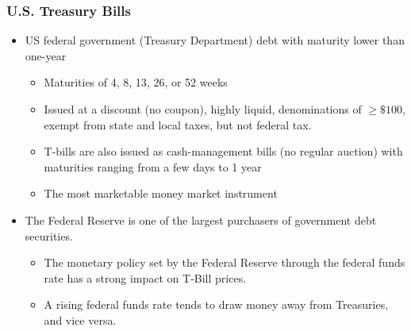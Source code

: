 \documentclass[10pt]{beamer}
\begin{document}
	
	\begin{frame}
		\frametitle{U.S. Treasury Bills}
		
		\begin{itemize}
			\item US federal government (Treasury Department) debt with maturity lower than one-year 		
			\begin{itemize}
				\item Maturities of 4, 8, 13, 26, or 52 weeks
				\item Issued at a discount (no coupon), highly liquid,  denominations of $\ge \$100$, exempt from state and local taxes, but not federal tax.
				\item T-bills are also issued as cash-management bills (no regular auction) with maturities ranging from a few days to 1 year 
				\item The most marketable money market instrument
			\end{itemize}		
			
			\item The Federal Reserve is one of the largest purchasers of government debt securities. 
			\begin{itemize}
				\item The monetary policy set by the Federal Reserve through the federal funds rate has a strong impact on T-Bill prices.
				\item A rising federal funds rate tends to draw money away from Treasuries, and vice versa.
			\end{itemize}
			
		\end{itemize}		
		
	\end{frame}
	
	
	
\end{document}
